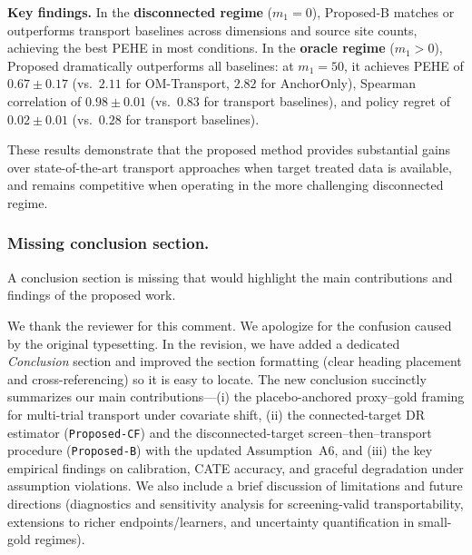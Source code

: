 {\medskip
\noindent
\textbf{Key findings.}
In the \textbf{disconnected regime} ($m_1=0$), Proposed-B matches or outperforms transport baselines across dimensions and source site counts, achieving the best PEHE in most conditions.
In the \textbf{oracle regime} ($m_1>0$), Proposed dramatically outperforms all baselines: at $m_1=50$, it achieves PEHE of $0.67 \pm 0.17$ (vs.\ $2.11$ for OM-Transport, $2.82$ for AnchorOnly), Spearman correlation of $0.98 \pm 0.01$ (vs.\ $0.83$ for transport baselines), and policy regret of $0.02 \pm 0.01$ (vs.\ $0.28$ for transport baselines).

These results demonstrate that the proposed method provides substantial gains over state-of-the-art transport approaches when target treated data is available, and remains competitive when operating in the more challenging disconnected regime.
}



\subsubsection{Missing conclusion section.}  
A conclusion section is missing that would highlight the main contributions and findings of the proposed work.

{\color{blue}
We thank the reviewer for this comment. We apologize for the confusion caused by the original typesetting. In the revision, we have added a dedicated \emph{Conclusion} section and improved the section formatting (clear heading placement and cross-referencing) so it is easy to locate. The new conclusion succinctly summarizes our main contributions---(i) the placebo-anchored proxy--gold framing for multi-trial transport under covariate shift, (ii) the connected-target DR estimator (\texttt{Proposed-CF}) and the disconnected-target screen--then--transport procedure (\texttt{Proposed-B}) with the updated Assumption~A6, and (iii) the key empirical findings on calibration, CATE accuracy, and graceful degradation under assumption violations. We also include a brief discussion of limitations and future directions (diagnostics and sensitivity analysis for screening-valid transportability, extensions to richer endpoints/learners, and uncertainty quantification in small-gold regimes).
}


\clearpage